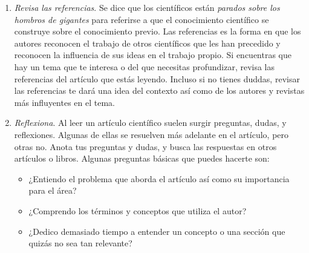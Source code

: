 \begin{enumerate}
    \item \emph{Revisa las referencias}. Se dice que los científicos están
          \emph{parados sobre los hombros de gigantes} para referirse a que el
          conocimiento científico se construye sobre el conocimiento previo.
          Las referencias es la forma en que los autores reconocen el trabajo de
          otros científicos que les han precedido y reconocen la influencia de
          sus ideas en el trabajo propio.
          Si encuentras que hay un tema que te interesa o del que necesitas
          profundizar, revisa las referencias del artículo que estás leyendo.
          Incluso si no tienes duddas, revisar las referencias te dará una idea
          del contexto así como de los autores y revistas más influyentes en el
          tema.
    \item \emph{Reflexiona}. Al leer un artículo científico suelen surgir
          preguntas, dudas, y reflexiones.
          Algunas de ellas se resuelven más adelante en el artículo, pero otras
          no.
          Anota tus preguntas y dudas, y busca las respuestas en otros artículos
          o libros.
          Algunas preguntas básicas que puedes hacerte son:
          \begin{itemize}
              \item ¿Entiendo el problema que aborda el artículo así como su
                    importancia para el área?
              \item ¿Comprendo los términos y conceptos que utiliza el autor?
              \item ¿Dedico demasiado tiempo a entender un concepto o una
                    sección que quizás no sea tan relevante?

\end{itemize}
\end{enumerate}
